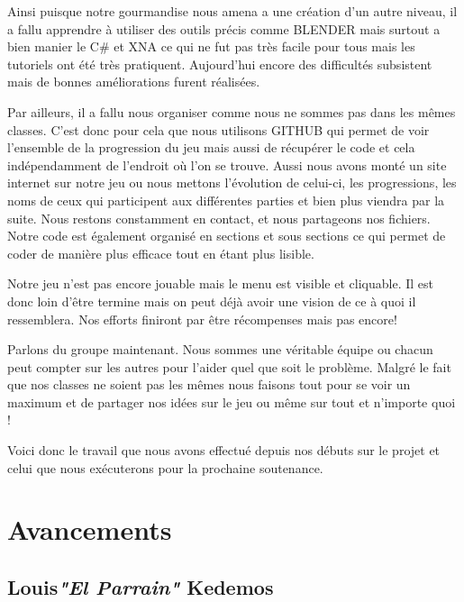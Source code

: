 \documentclass{article}
\begin{document}
\par
Ainsi puisque notre gourmandise nous amena a une création d'un autre niveau, il a fallu apprendre à utiliser des outils précis comme BLENDER mais surtout a bien manier le C\# et XNA ce qui ne fut pas très facile pour tous mais les tutoriels ont été très pratiquent. Aujourd'hui encore des difficultés subsistent mais de bonnes améliorations furent réalisées.
\newline

\par
Par ailleurs, il a fallu nous organiser comme nous ne sommes pas dans les mêmes classes. C'est donc pour cela que nous utilisons GITHUB qui permet de voir l'ensemble de la progression du jeu mais aussi de récupérer le code et cela indépendamment de l'endroit où l'on se trouve. Aussi nous avons monté un site internet sur notre jeu ou nous mettons l’évolution de celui-ci, les progressions, les noms de ceux qui participent aux différentes parties et bien plus viendra par la suite. Nous restons constamment en contact, et nous partageons nos fichiers. Notre code est également organisé en sections et sous sections ce qui permet de coder de manière plus efficace tout en étant plus lisible.
\newline

\par
Notre jeu n'est pas encore jouable mais le menu est visible et cliquable. Il est donc loin d'être termine mais on peut déjà avoir une vision de ce à quoi il ressemblera. Nos efforts finiront par être récompenses mais pas encore!
\newline

\par
Parlons du groupe maintenant. Nous sommes une véritable équipe ou chacun peut compter sur les autres pour l'aider quel que soit le problème. Malgré le fait que nos classes ne soient pas les mêmes nous faisons tout pour se voir un maximum et de partager nos idées sur le jeu ou même sur tout et n'importe quoi !
\newline

\par
Voici donc le travail que nous avons effectué depuis nos débuts sur le projet et celui que nous exécuterons pour la prochaine soutenance.

\newpage

\section{Avancements}
\subsection{Louis\textcolor{pseudoblue}{\textit{"El Parrain"}} Kedemos}
\end{document}
